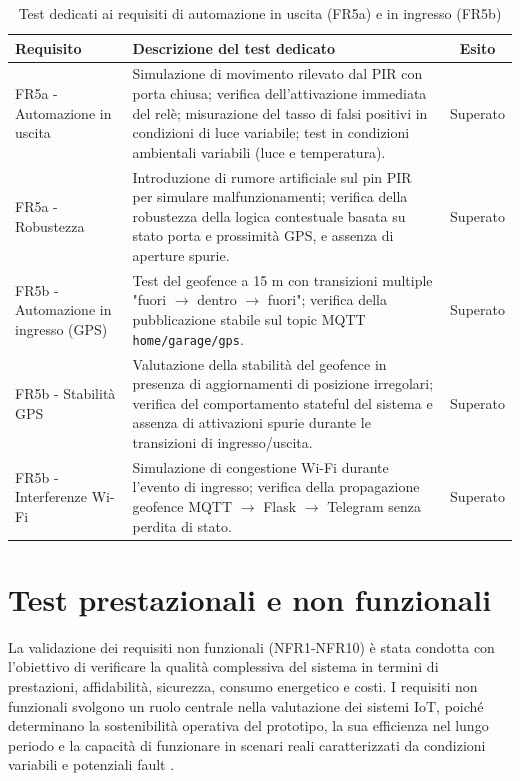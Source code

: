 \begin{table}[h!]
    \centering
    \caption{Test dedicati ai requisiti di automazione in uscita (FR5a) e in ingresso (FR5b)}
    \label{tab:automation_tests}
    \begin{tabular}{|p{4cm}|p{7cm}|c|}
    \hline
    \textbf{Requisito} & \textbf{Descrizione del test dedicato} & \textbf{Esito} \\ \hline
    FR5a - Automazione in uscita & Simulazione di movimento rilevato dal PIR con porta chiusa; verifica dell'attivazione immediata del relè; misurazione del tasso di falsi positivi in condizioni di luce variabile; test in condizioni ambientali variabili (luce e temperatura). & Superato \\ \hline
    FR5a - Robustezza & Introduzione di rumore artificiale sul pin PIR per simulare malfunzionamenti; verifica della robustezza della logica contestuale basata su stato porta e prossimità GPS, e assenza di aperture spurie. & Superato \\ \hline
    FR5b - Automazione in ingresso (GPS) & Test del geofence a 15 m con transizioni multiple "fuori $\rightarrow$ dentro $\rightarrow$ fuori"; verifica della pubblicazione stabile sul topic MQTT \texttt{home/garage/gps}. & Superato \\ \hline
    FR5b - Stabilità GPS &  Valutazione della stabilità del geofence in presenza di aggiornamenti di posizione irregolari; verifica del comportamento stateful del sistema e assenza di attivazioni spurie durante le transizioni di ingresso/uscita. &  Superato \\ \hline
    FR5b - Interferenze Wi-Fi & Simulazione di congestione Wi-Fi durante l'evento di ingresso; verifica della propagazione geofence MQTT $\rightarrow$ Flask $\rightarrow$ Telegram senza perdita di stato. & Superato \\ \hline
    \end{tabular}
\end{table}




\section{Test prestazionali e non funzionali}
La validazione dei requisiti non funzionali (NFR1-NFR10) è stata condotta con l'obiettivo di verificare la qualità complessiva del sistema in termini di prestazioni, affidabilità, sicurezza, consumo energetico e costi. I requisiti non funzionali svolgono un ruolo centrale nella valutazione dei sistemi IoT, poiché determinano la sostenibilità operativa del prototipo, la sua efficienza nel lungo periodo e la capacità di funzionare in scenari reali caratterizzati da condizioni variabili e potenziali fault \cite{Avizienis2004, Tang2022}.

